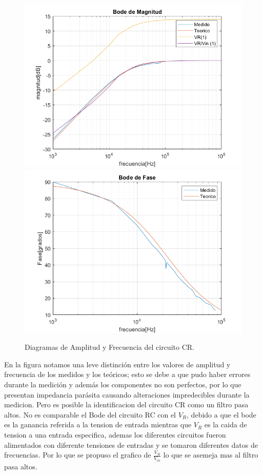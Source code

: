 \begin{figure}[H]
\centering
\includegraphics[scale=0.5]{2Compmag.png}
\includegraphics[scale=0.5]{2Compfase.png}
\caption{Diagramas de Amplitud y Frecuencia del circuito CR.}
\label{fig:CR}
\end{figure}

En la figura notamos una leve distinción entre los valores de amplitud y frecuencia de los medidos y los teóricos; esto se debe a que pudo haber errores durante la medición y además los componentes no son perfectos, por lo que presentan impedancia parásita causando alteraciones impredecibles durante la medicion. Pero es posible la identificacion del circuito CR como un filtro pasa altos.
No es comparable el Bode del circuito RC con el $V_R$, debido a que el bode es la ganancia referida a la tension de entrada mientras que $V_R$ es la caida de tension a una entrada especifica, ademas los diferentes circuitos fueron alimentados con diferente tensiones de entradas y se tomaron diferentes datos de frecuencias. Por lo que se propuso el grafico de $\frac{V_R}{V_{in}}$ lo que se asemeja mas al filtro pasa altos.

